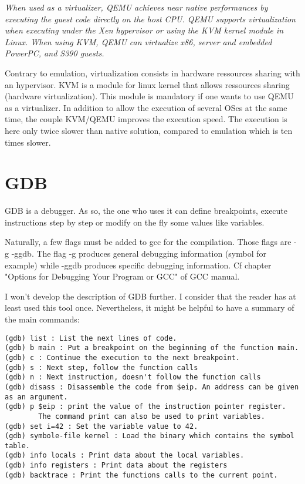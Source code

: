 \textit{When used as a virtualizer, QEMU achieves near native performances by executing the guest code directly on the host CPU. QEMU supports virtualization when executing under the Xen hypervisor or using the KVM kernel module in Linux. When using KVM, QEMU can virtualize x86, server and embedded PowerPC, and S390 guests.}

Contrary to emulation, virtualization consists in hardware ressources sharing with an hypervisor. KVM is a module for linux kernel that allows ressources sharing (hardware virtualization). This module is mandatory if one wants to use QEMU as a virtualizer. In addition to allow the execution of several OSes at the same time, the couple KVM/QEMU improves the execution speed. The execution is here only twice slower than native solution, compared to emulation which is ten times slower.

\section{GDB}
GDB is a debugger. As so, the one who uses it can define breakpoints, execute instructions step by step or modify on the fly some values like variables.

Naturally, a few flags must be added to gcc for the compilation. Those flags are -g -ggdb. The flag -g produces general debugging information (symbol for example) while -ggdb produces specific debugging information. Cf chapter "Options for Debugging Your Program or GCC" of GCC manual.

I won't develop the description of GDB further. I consider that the reader has at least used this tool once. Nevertheless, it might be helpful to have a summary of the main commands:

\begin{verbatim}
(gdb) list : List the next lines of code.
(gdb) b main : Put a breakpoint on the beginning of the function main.
(gdb) c : Continue the execution to the next breakpoint.
(gdb) s : Next step, follow the function calls
(gdb) n : Next instruction, doesn't follow the function calls
(gdb) disass : Disassemble the code from $eip. An address can be given as an argument.
(gdb) p $eip : print the value of the instruction pointer register.
		The command print can also be used to print variables.
(gdb) set i=42 : Set the variable value to 42.
(gdb) symbole-file kernel : Load the binary which contains the symbol table.
(gdb) info locals : Print data about the local variables.
(gdb) info registers : Print data about the registers
(gdb) backtrace : Print the functions calls to the current point.
\end{verbatim}

